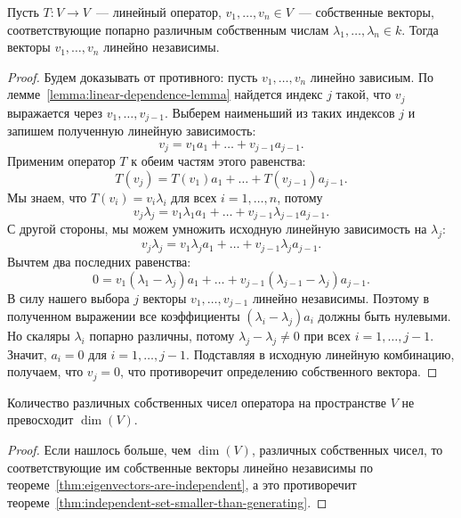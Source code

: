 \begin{theorem}\label{thm:eigenvectors-are-independent}
Пусть $T\colon V\to V$~--- линейный оператор,
$v_1,\dots,v_n\in V$~--- собственные векторы, соответствующие
попарно различным собственным числам $\lambda_1,\dots,\lambda_n\in k$.
Тогда векторы $v_1,\dots,v_n$ линейно независимы.
\end{theorem}
\begin{proof}
Будем доказывать от противного: пусть $v_1,\dots,v_n$ линейно зависиым.
По лемме~\ref{lemma:linear-dependence-lemma} найдется индекс
$j$ такой, что $v_j$ выражается через $v_1,\dots,v_{j-1}$.
Выберем наименьший из таких индексов $j$ и запишем полученную
линейную зависимость:
$$
v_j = v_1a_1 + \dots + v_{j-1}a_{j-1}.
$$
Применим оператор $T$ к обеим частям этого равенства:
$$
T(v_j) = T(v_1)a_1 + \dots + T(v_{j-1})a_{j-1}.
$$
Мы знаем, что $T(v_i) = v_i\lambda_i$ для всех $i=1,\dots,n$, потому
$$
v_j\lambda_j = v_1\lambda_1a_1 + \dots + v_{j-1}\lambda_{j-1}a_{j-1}.
$$
С другой стороны, мы можем умножить исходную линейную зависимость
на $\lambda_j$:
$$
v_j\lambda_j = v_1\lambda_j a_1 + \dots + v_{j-1}\lambda_j a_{j-1}.
$$
Вычтем два последних равенства:
$$
0 = v_1(\lambda_1-\lambda_j)a_1 + \dots +
v_{j-1}(\lambda_{j-1}-\lambda_j)a_{j-1}.
$$
В силу нашего выбора $j$ векторы $v_1,\dots,v_{j-1}$ линейно независимы.
Поэтому в полученном выражении все коэффициенты
$(\lambda_i-\lambda_j)a_i$ должны быть нулевыми. Но скаляры
$\lambda_i$ попарно различны, потому $\lambda_j-\lambda_j\neq 0$
при всех $i=1,\dots,j-1$. Значит, $a_i=0$ для $i=1,\dots,j-1$. Подставляя
в исходную линейную комбинацию, получаем, что $v_j=0$,
что противоречит определению собственного вектора.
\end{proof}

\begin{corollary}
Количество различных собственных чисел оператора на пространстве $V$
не превосходит $\dim(V)$.
\end{corollary}
\begin{proof}
Если нашлось больше, чем $\dim(V)$, различных собственных чисел,
то соответствующие им собственные векторы линейно независимы
по теореме~\ref{thm:eigenvectors-are-independent}, а это
противоречит теореме~\ref{thm:independent-set-smaller-than-generating}.
\end{proof}

